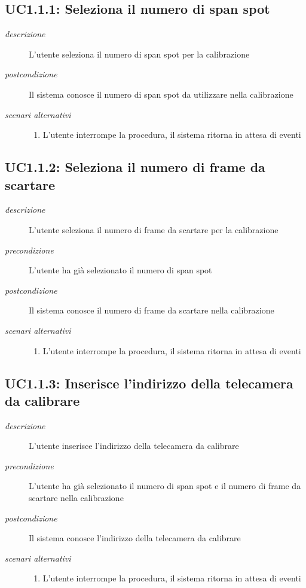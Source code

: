 \subsection{UC1.1.1: Seleziona il numero di span spot} \label{sec:UC1.1.1}
\begin{description}
\item[\em{descrizione }]L'utente seleziona il numero di span spot per la calibrazione
\item[\em{postcondizione }] Il sistema conosce il numero di span spot da utilizzare nella calibrazione
\item[\em{scenari alternativi }] \mbox{} 
\begin{enumerate} 
\item L'utente interrompe la procedura, il sistema ritorna in attesa di eventi
\end{enumerate}
\end{description}

\subsection{UC1.1.2: Seleziona il numero di frame da scartare} \label{sec:UC1.1.2}
\begin{description}
\item[\em{descrizione }]L'utente seleziona il numero di frame da scartare per la calibrazione
\item[\em{precondizione }] L'utente ha già selezionato il numero di span spot
\item[\em{postcondizione }] Il sistema conosce il numero di frame da scartare nella calibrazione
\item[\em{scenari alternativi }] \mbox{} 
\begin{enumerate} 
\item L'utente interrompe la procedura, il sistema ritorna in attesa di eventi
\end{enumerate}
\end{description}

\subsection{UC1.1.3: Inserisce l'indirizzo della telecamera da calibrare} \label{sec:UC1.1.3}
\begin{description}
\item[\em{descrizione }]L'utente inserisce l'indirizzo della telecamera da calibrare
\item[\em{precondizione }] L'utente ha già selezionato il numero di span spot e il numero di frame da scartare nella calibrazione
\item[\em{postcondizione }] Il sistema conosce l'indirizzo della telecamera da calibrare
\item[\em{scenari alternativi }] \mbox{} 
\begin{enumerate} 
\item L'utente interrompe la procedura, il sistema ritorna in attesa di eventi
\end{enumerate}
\end{description}

